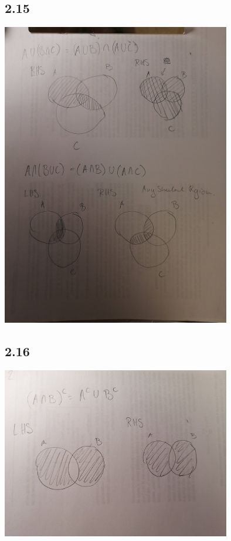 \documentclass[11pt]{book}
\begin{document}

\subsection{2.15}%
\label{sub:2_15}

\begin{center}
    \includegraphics[width=100mm]{assets/sug-dist.jpg} 
\end{center}


\subsection{2.16}%
\label{sub:2_16}

\begin{center}
    \includegraphics[width=100mm]{assets/sug-morg.jpg} 
\end{center}
\end{document}
